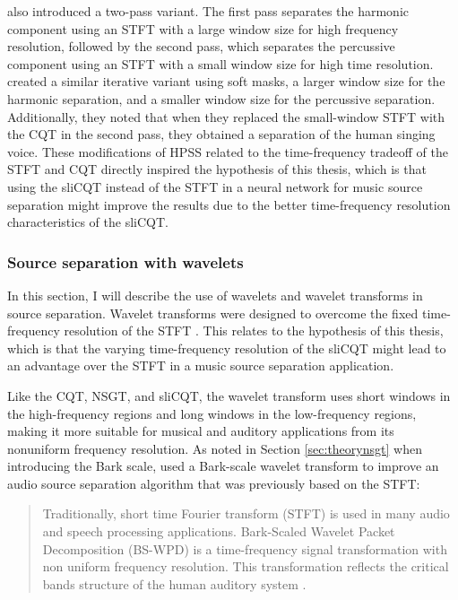 \documentclass[report.tex]{subfiles}
\begin{document}
\textcite{driedger} also introduced a two-pass variant. The first pass separates the harmonic component using an STFT with a large window size for high frequency resolution, followed by the second pass, which separates the percussive component using an STFT with a small window size for high time resolution. \textcite{fitzgerald2} created a similar iterative variant using soft masks, a larger window size for the harmonic separation, and a smaller window size for the percussive separation. Additionally, they noted that when they replaced the small-window STFT with the CQT in the second pass, they obtained a separation of the human singing voice. These modifications of HPSS related to the time-frequency tradeoff of the STFT and CQT directly inspired the hypothesis of this thesis, which is that using the sliCQT instead of the STFT in a neural network for music source separation might improve the results due to the better time-frequency resolution characteristics of the sliCQT.

\subsubsection{Source separation with wavelets}
\label{sec:wavelets}

In this section, I will describe the use of wavelets and wavelet transforms in source separation. Wavelet transforms were designed to overcome the fixed time-frequency resolution of the STFT \parencite{wavelets1, wavelets2}. This relates to the hypothesis of this thesis, which is that the varying time-frequency resolution of the sliCQT might lead to an advantage over the STFT in a music source separation application.

Like the CQT, NSGT, and sliCQT, the wavelet transform uses short windows in the high-frequency regions and long windows in the low-frequency regions, making it more suitable for musical and auditory applications from its nonuniform frequency resolution. As noted in Section \ref{sec:theorynsgt} when introducing the Bark scale, \textcite{barkjust1} used a Bark-scale wavelet transform to improve an audio source separation algorithm that was previously based on the STFT:

\begin{quote}
	Traditionally, short time Fourier transform (STFT) is used in many audio and speech processing applications. Bark-Scaled Wavelet Packet Decomposition (BS-WPD) is a time-frequency signal transformation with non uniform frequency resolution. This transformation reflects the critical bands structure of the human auditory system \parencite[1]{barkjust1}.
\end{quote}
\end{document}
